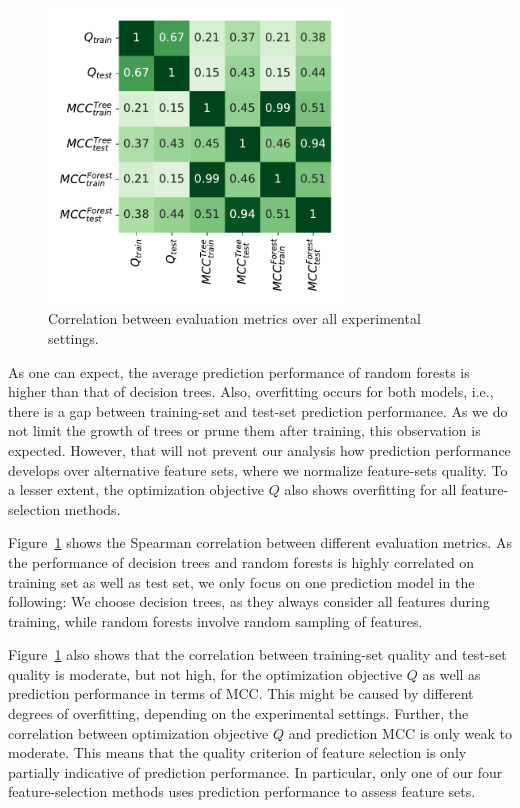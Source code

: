 \documentclass{article}
\theoremstyle{definition}
\begin{document}
\begin{figure}[htb]
	\centering
	\includegraphics[width=0.7\textwidth]{plots/evaluation-metrics-correlation.pdf}
	\caption{Correlation between evaluation metrics over all experimental settings.}
	\label{fig:evaluation-metrics-correlation}
\end{figure}

As one can expect, the average prediction performance of random forests is higher than that of decision trees.
Also, overfitting occurs for both models, i.e., there is a gap between training-set and test-set prediction performance.
As we do not limit the growth of trees or prune them after training, this observation is expected.
However, that will not prevent our analysis how prediction performance develops over alternative feature sets, where we normalize feature-sets quality.
To a lesser extent, the optimization objective $Q$ also shows overfitting for all feature-selection methods.

Figure~\ref{fig:evaluation-metrics-correlation} shows the Spearman correlation between different evaluation metrics.
As the performance of decision trees and random forests is highly correlated on training set as well as test set, we only focus on one prediction model in the following:
We choose decision trees, as they always consider all features during training, while random forests involve random sampling of features.

Figure~\ref{fig:evaluation-metrics-correlation} also shows that the correlation between training-set quality and test-set quality is moderate, but not high, for the optimization objective $Q$ as well as prediction performance in terms of MCC.
This might be caused by different degrees of overfitting, depending on the experimental settings.
Further, the correlation between optimization objective $Q$ and prediction MCC is only weak to moderate.
This means that the quality criterion of feature selection is only partially indicative of prediction performance.
In particular, only one of our four feature-selection methods uses prediction performance to assess feature sets.
\end{document}
